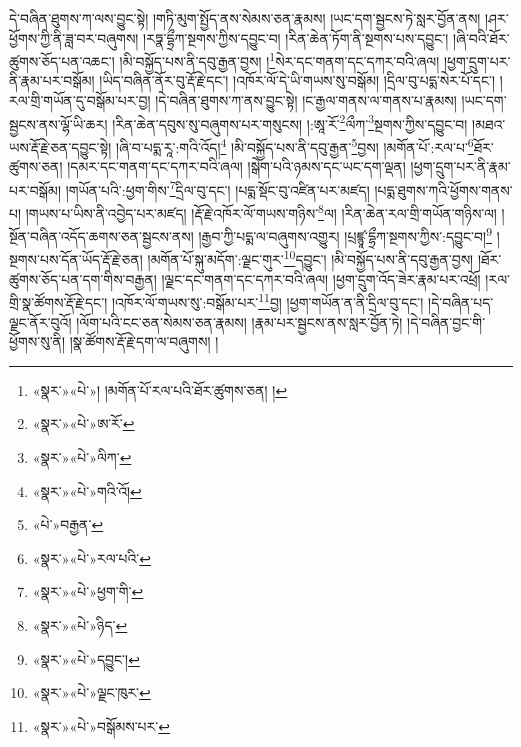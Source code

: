 དེ་བཞིན་ཐུགས་ཀ་ལས་བྱུང་སྟེ། །གཏི་མུག་སྤྱོད་ནས་སེམས་ཅན་རྣམས། །ཡང་དག་སྦྱངས་ཏེ་སླར་བྱོན་ནས། །ཤར་ཕྱོགས་ཀྱི་ནི་ཟླ་བར་བཞུགས། །རཏྣ་དྷྲྀཀ་སྔགས་ཀྱིས་དབྱུང་བ། །རིན་ཆེན་ཏོག་ནི་སྔགས་པས་དབྱུང་། །ཞི་བའི་ཐོར་ཚུགས་ཅོད་པན་འཆང་། །མི་བསྐྱོད་པས་ནི་དབུ་རྒྱན་བྱས། །\footnote{«སྣར་»«པེ་»། །མགོན་པོ་རལ་པའི་ཐོར་ཚུགས་ཅན། །}སེར་དང་གནག་དང་དཀར་བའི་ཞལ། །ཕྱག་དྲུག་པར་ནི་རྣམ་པར་བསྒོམ། །ཡིད་བཞིན་ནོར་བུ་རྡོ་རྗེ་དང་། །འཁོར་ལོ་དེ་ཡི་གཡས་སུ་བསྒོམ། །དྲིལ་བུ་པདྨ་སེར་པོ་དང་། །རལ་གྲི་གཡོན་དུ་བསྒོམ་པར་བྱ། །དེ་བཞིན་ཐུགས་ཀ་ནས་བྱུང་སྟེ། །ང་རྒྱལ་གནས་ལ་གནས་པ་རྣམས། །ཡང་དག་སྦྱངས་ནས་ལྷོ་ཡི་ཆར། །རིན་ཆེན་དབུས་སུ་བཞུགས་པར་གསུངས། །:ཨཱ་རོ་\footnote{«སྣར་»«པེ་»ཨ་རོ་}ལྀཀ་\footnote{«སྣར་»«པེ་»ལིཀ་}སྔགས་ཀྱིས་དབྱུང་བ། །མཐའ་ཡས་རྡོ་རྗེ་ཅན་དབྱུང་སྟེ། །ཞི་བ་པདྨ་རཱ་:གའི་འོད།\footnote{«སྣར་»«པེ་»གའི་འོ།} །མི་བསྐྱོད་པས་ནི་དབུ་རྒྱན་\footnote{«པེ་»བརྒྱན་}བྱས། །མགོན་པོ་:རལ་པ་\footnote{«སྣར་»«པེ་»རལ་པའི་}ཐོར་ཚུགས་ཅན། །དམར་དང་གནག་དང་དཀར་བའི་ཞལ། །སྒེག་པའི་ཉམས་དང་ཡང་དག་ལྡན། །ཕྱག་དྲུག་པར་ནི་རྣམ་པར་བསྒོམ། །གཡོན་པའི་:ཕྱག་གིས་\footnote{«སྣར་»«པེ་»ཕྱག་གི་}དྲིལ་བུ་དང་། །པདྨ་སྡོང་བུ་འཛིན་པར་མཛད། །པདྨ་ཐུགས་ཀའི་ཕྱོགས་གནས་པ། །གཡས་པ་ཡིས་ནི་འབྱེད་པར་མཛད། །རྡོ་རྗེ་འཁོར་ལོ་གཡས་གཉིས་\footnote{«སྣར་»«པེ་»ཉིད་}ལ། །རིན་ཆེན་རལ་གྲི་གཡོན་གཉིས་ལ། །སྔོན་བཞིན་འདོད་ཆགས་ཅན་སྦྱངས་ནས། །རྒྱབ་ཀྱི་པདྨ་ལ་བཞུགས་འགྱུར། །པྲཛྙཱ་དྷྲྀཀ་སྔགས་ཀྱིས་:དབྱུང་བ།\footnote{«སྣར་»«པེ་»དབྱུང་།} །སྔགས་པས་དོན་ཡོད་རྡོ་རྗེ་ཅན། །མགོན་པོ་སྐུ་མདོག་:ལྗང་གུར་\footnote{«སྣར་»«པེ་»ལྗང་ཁུར་}དབྱུང་། །མི་བསྐྱོད་པས་ནི་དབུ་རྒྱན་བྱས། །ཐོར་ཚུགས་ཅོད་པན་དག་གིས་བརྒྱན། །ལྗང་དང་གནག་དང་དཀར་བའི་ཞལ། །ཕྱག་དྲུག་འོད་ཟེར་རྣམ་པར་འཕྲོ། །རལ་གྲི་སྣ་ཚོགས་རྡོ་རྗེ་དང་། །འཁོར་ལོ་གཡས་སུ་:བསྒོམ་པར་\footnote{«སྣར་»«པེ་»བསྒོམས་པར་}བྱ། །ཕྱག་གཡོན་ན་ནི་དྲིལ་བུ་དང་། །དེ་བཞིན་པད་ལྗང་ནོར་བུའོ། །ལོག་པའི་ངང་ཅན་སེམས་ཅན་རྣམས། །རྣམ་པར་སྦྱངས་ནས་སླར་བྱོན་ཏེ། །དེ་བཞིན་བྱང་གི་ཕྱོགས་སུ་ནི། །སྣ་ཚོགས་རྡོ་རྗེ་དག་ལ་བཞུགས། །
